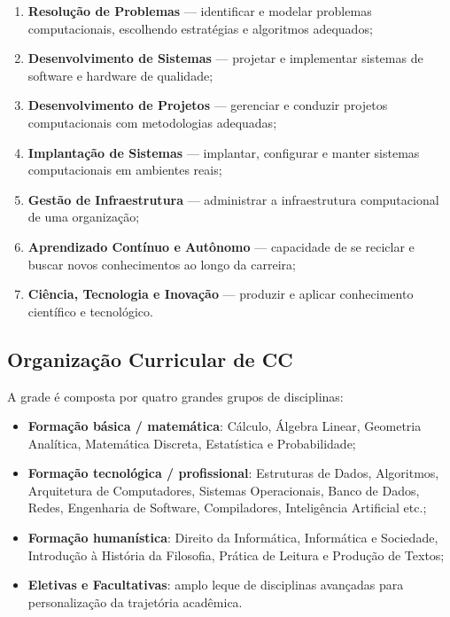 \documentclass[9pt,a4paper]{extarticle}
\begin{document}
\begin{enumerate}
  \item \textbf{Resolução de Problemas} --- identificar e modelar problemas computacionais, escolhendo estratégias e algoritmos adequados;
  \item \textbf{Desenvolvimento de Sistemas} --- projetar e implementar sistemas de software e hardware de qualidade;
  \item \textbf{Desenvolvimento de Projetos} --- gerenciar e conduzir projetos computacionais com metodologias adequadas;
  \item \textbf{Implantação de Sistemas} --- implantar, configurar e manter sistemas computacionais em ambientes reais;
  \item \textbf{Gestão de Infraestrutura} --- administrar a infraestrutura computacional de uma organização;
  \item \textbf{Aprendizado Contínuo e Autônomo} --- capacidade de se reciclar e buscar novos conhecimentos ao longo da carreira;
  \item \textbf{Ciência, Tecnologia e Inovação} --- produzir e aplicar conhecimento científico e tecnológico.
\end{enumerate}

\subsection{Organização Curricular de CC}

A grade é composta por quatro grandes grupos de disciplinas:

\begin{itemize}
  \item \textbf{Formação básica / matemática}: Cálculo, Álgebra Linear, Geometria Analítica, Matemática Discreta, Estatística e Probabilidade;
  \item \textbf{Formação tecnológica / profissional}: Estruturas de Dados, Algoritmos, Arquitetura de Computadores, Sistemas Operacionais, Banco de Dados, Redes, Engenharia de Software, Compiladores, Inteligência Artificial etc.;
  \item \textbf{Formação humanística}: Direito da Informática, Informática e Sociedade, Introdução à História da Filosofia, Prática de Leitura e Produção de Textos;
  \item \textbf{Eletivas e Facultativas}: amplo leque de disciplinas avançadas para personalização da trajetória acadêmica.
\end{itemize}
\end{document}
